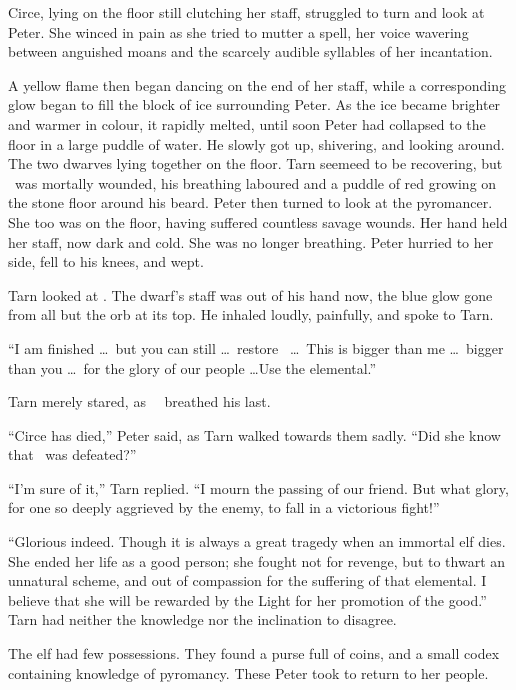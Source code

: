 Circe, lying on the floor still clutching her staff, struggled to turn and look at Peter.  She winced in pain as she tried to mutter a spell, her voice wavering between anguished moans and the scarcely audible syllables of her incantation.

A yellow flame then began dancing on the end of her staff, while a corresponding glow began to fill the block of ice surrounding Peter.  As the ice became brighter and warmer in colour, it rapidly melted, until soon Peter had collapsed to the floor in a large puddle of water.  He slowly got up, shivering, and looking around.  The two dwarves lying together on the floor.  Tarn seemeed to be recovering, but \mothzam\ was mortally wounded, his breathing laboured and a puddle of red growing on the stone floor around his beard.  Peter then turned to look at the pyromancer.  She too was on the floor, having suffered countless savage wounds.  Her hand held her staff, now dark and cold.  She was no longer breathing.  Peter hurried to her side, fell to his knees, and wept.

Tarn looked at \mothzam.  The dwarf's staff was out of his hand now, the blue glow gone from all but the orb at its top.  He inhaled loudly, painfully, and spoke to Tarn.

``I am finished \ldots\ but you can still \ldots\ restore \valdunmir\ \ldots\ This is bigger than me \ldots\ bigger than you \ldots\ for the glory of our people \ldots Use the elemental.''

Tarn merely stared, as \mothzam\ \driktur\ breathed his last.

``Circe has died,'' Peter said, as Tarn walked towards them sadly.  ``Did she know that \mothzam\ was defeated?''

``I'm sure of it,'' Tarn replied.  ``I mourn the passing of our friend.  But what glory, for one so deeply aggrieved by the enemy, to fall in a victorious fight!''

``Glorious indeed.  Though it is always a great tragedy when an immortal elf dies.  She ended her life as a good person; she fought not for revenge, but to thwart an unnatural scheme, and out of compassion for the suffering of that elemental.  I believe that she will be rewarded by the Light for her promotion of the good.''  Tarn had neither the knowledge nor the inclination to disagree.

The elf had few possessions.  They found a purse full of coins, and a small codex containing knowledge of pyromancy.  These Peter took to return to her people.

